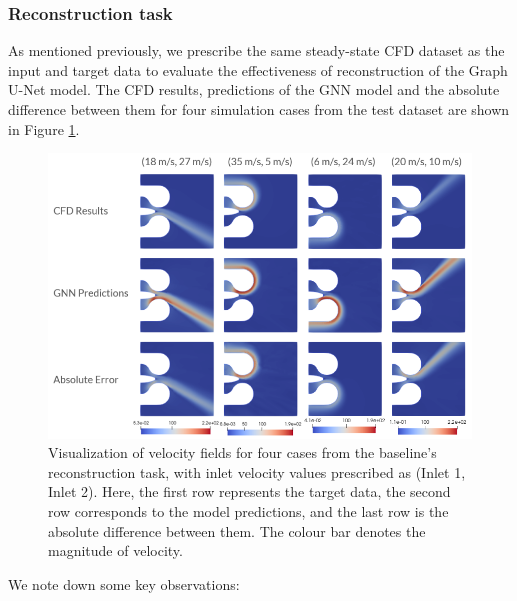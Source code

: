 \subsubsection{Reconstruction task}
As mentioned previously, we prescribe the same steady-state CFD dataset as the input and target data to evaluate the effectiveness of reconstruction of the Graph U-Net model. The CFD results, predictions of the GNN model and the absolute difference between them for four simulation cases from the test dataset are shown in Figure \ref{blrecon}.
\begin{figure}[ht]
    \centering
    \includegraphics[width=14cm]{images/Methodology/reconcorrect.png}
    \caption{Visualization of velocity fields for four cases from the baseline's reconstruction task, with inlet velocity values prescribed as (Inlet 1, Inlet 2). Here, the first row represents the target data, the second row corresponds to the model predictions, and the last row is the absolute difference between them. The colour bar denotes the magnitude of velocity. } 
    \label{blrecon}
\end{figure}
We note down some key observations: 

